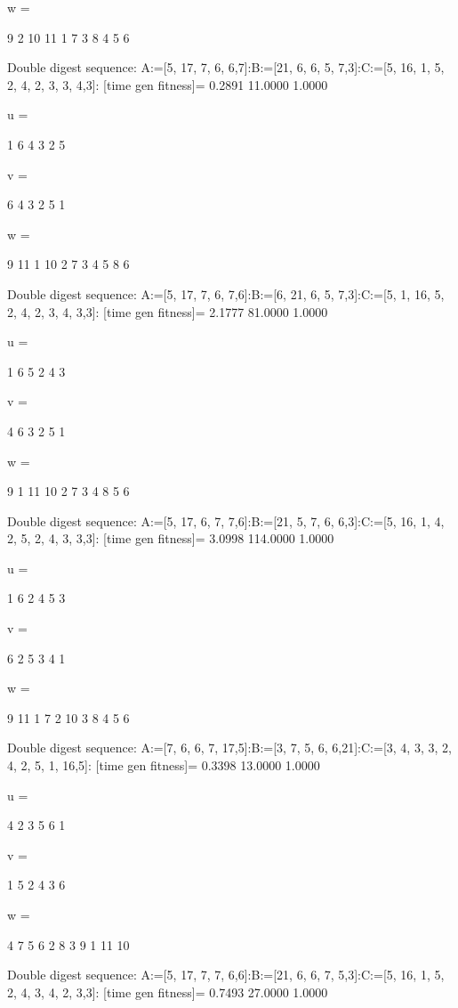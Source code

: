 w =

     9     2    10    11     1     7     3     8     4     5     6

Double digest sequence:
A:=[5, 17, 7, 6, 6,7]:B:=[21, 6, 6, 5, 7,3]:C:=[5, 16, 1, 5, 2, 4, 2, 3, 3, 4,3]:
[time gen fitness]=
    0.2891   11.0000    1.0000


u =

     1     6     4     3     2     5


v =

     6     4     3     2     5     1


w =

     9    11     1    10     2     7     3     4     5     8     6

Double digest sequence:
A:=[5, 17, 7, 6, 7,6]:B:=[6, 21, 6, 5, 7,3]:C:=[5, 1, 16, 5, 2, 4, 2, 3, 4, 3,3]:
[time gen fitness]=
    2.1777   81.0000    1.0000


u =

     1     6     5     2     4     3


v =

     4     6     3     2     5     1


w =

     9     1    11    10     2     7     3     4     8     5     6

Double digest sequence:
A:=[5, 17, 6, 7, 7,6]:B:=[21, 5, 7, 6, 6,3]:C:=[5, 16, 1, 4, 2, 5, 2, 4, 3, 3,3]:
[time gen fitness]=
    3.0998  114.0000    1.0000


u =

     1     6     2     4     5     3


v =

     6     2     5     3     4     1


w =

     9    11     1     7     2    10     3     8     4     5     6

Double digest sequence:
A:=[7, 6, 6, 7, 17,5]:B:=[3, 7, 5, 6, 6,21]:C:=[3, 4, 3, 3, 2, 4, 2, 5, 1, 16,5]:
[time gen fitness]=
    0.3398   13.0000    1.0000


u =

     4     2     3     5     6     1


v =

     1     5     2     4     3     6


w =

     4     7     5     6     2     8     3     9     1    11    10

Double digest sequence:
A:=[5, 17, 7, 7, 6,6]:B:=[21, 6, 6, 7, 5,3]:C:=[5, 16, 1, 5, 2, 4, 3, 4, 2, 3,3]:
[time gen fitness]=
    0.7493   27.0000    1.0000


